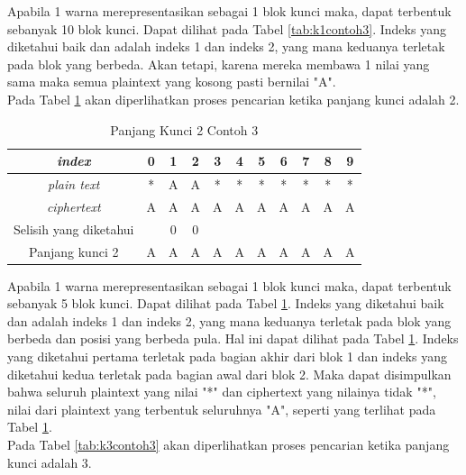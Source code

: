 	Apabila 1 warna merepresentasikan sebagai 1 blok kunci maka, dapat terbentuk sebanyak 10 blok kunci. Dapat dilihat pada Tabel \ref{tab:k1contoh3}. Indeks yang diketahui baik \plaintext dan \ciphertext adalah indeks 1 dan indeks 2, yang mana keduanya terletak pada blok yang berbeda. Akan tetapi, karena mereka membawa 1 nilai yang sama maka semua plaintext yang kosong pasti bernilai "A".
	\\
	Pada Tabel \ref{tab:k2contoh3} akan diperlihatkan proses pencarian ketika panjang kunci adalah 2.
	\begin{table}[H]
	 	\centering
	 	\caption{Panjang Kunci 2 Contoh 3}
	 	\setlength{\arrayrulewidth}{.08em}
	 	\begin{tabular}{|c|c|c|c|c|c|c|c|c|c|c|}\hline
	 	\textit{index}&0&1&2&3&4&5&6&7&8&9\\ \hline
	 	\textit{plain text}&\cellcolor{blue!15}*&\cellcolor{blue!15}A&\cellcolor{green!15}A&\cellcolor{green!15}*&\cellcolor{pink!30}*&\cellcolor{pink!30}*&\cellcolor{violet!30}*&\cellcolor{violet!30}*&\cellcolor{purple!25}*&\cellcolor{purple!25}*\\ \hline
	 	\textit{ciphertext}&\cellcolor{blue!15}A&\cellcolor{blue!15}A&\cellcolor{green!15}A&\cellcolor{green!15}A&\cellcolor{pink!30}A&\cellcolor{pink!30}A&\cellcolor{violet!30}A&\cellcolor{violet!30}A&\cellcolor{purple!25}A&\cellcolor{purple!25}A\\ \hline
		Selisih yang diketahui & &0&0& & & & & & & \\ \hline	
		Panjang kunci 2 &A&A&A&A&A&A&A&A&A&A\\ \hline 	
	 	\end{tabular}
	 	\label{tab:k2contoh3}
	\end{table}
	Apabila 1 warna merepresentasikan sebagai 1 blok kunci maka, dapat terbentuk sebanyak 5 blok kunci. Dapat dilihat pada Tabel \ref{tab:k2contoh3}. Indeks yang diketahui baik \plaintext dan \ciphertext adalah indeks 1 dan indeks 2, yang mana keduanya terletak pada blok yang berbeda dan posisi yang berbeda pula. Hal ini dapat dilihat pada Tabel \ref{tab:k2contoh3}. Indeks yang diketahui pertama terletak pada bagian akhir dari blok 1 dan indeks yang diketahui kedua terletak pada bagian awal dari blok 2. Maka dapat disimpulkan bahwa seluruh plaintext yang nilai "*" dan ciphertext yang nilainya tidak "*", nilai dari plaintext yang terbentuk seluruhnya "A", seperti yang terlihat pada Tabel \ref{tab:k2contoh3}.
	\\	
	Pada Tabel \ref{tab:k3contoh3} akan diperlihatkan proses pencarian ketika panjang kunci adalah 3.
